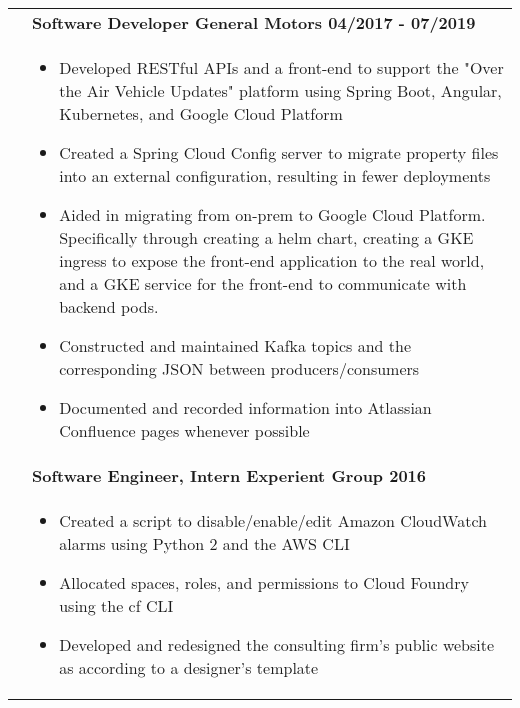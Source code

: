 \documentclass[final]{letter}
\begin{document}
\begin{center}
\begin{tabularx}{\linewidth}{>{\raggedright\bf\Large{}}p{10.75em}X}
			& \large\bf{Software Developer \hfill {General Motors} \hfill 04/2017 - 07/2019} \\
			& \begin{itemize}[noitemsep,topsep=0pt]\setlength\itemsep{2px}
				\item Developed RESTful APIs and a front-end to support the "Over the Air Vehicle Updates" platform using Spring Boot, Angular, Kubernetes, and Google Cloud Platform
				\item Created a Spring Cloud Config server to migrate property files into an external configuration, resulting in fewer deployments
				\item Aided in migrating from on-prem to Google Cloud Platform. Specifically through creating a helm chart, creating a GKE ingress to expose the front-end application to the real world, and a GKE service for the front-end to communicate with backend pods. 
				\item Constructed and maintained Kafka topics and the corresponding JSON between producers/consumers
				\item Documented and recorded information into Atlassian Confluence pages whenever possible
			\end{itemize} \\
		
			& \large\bf{Software Engineer, Intern \hfill {Experient Group} \hfill 2016} \\
			& \begin{itemize}[noitemsep,topsep=0pt]\setlength\itemsep{2px}
				\item Created a script to disable/enable/edit Amazon CloudWatch alarms using Python 2 and the AWS CLI
				\item Allocated spaces, roles, and permissions to Cloud Foundry using the cf CLI
				\item Developed and redesigned the consulting firm's public website as according to a designer's template
			\end{itemize} \\
		\end{tabularx} \\


\end{center}
\end{document}
